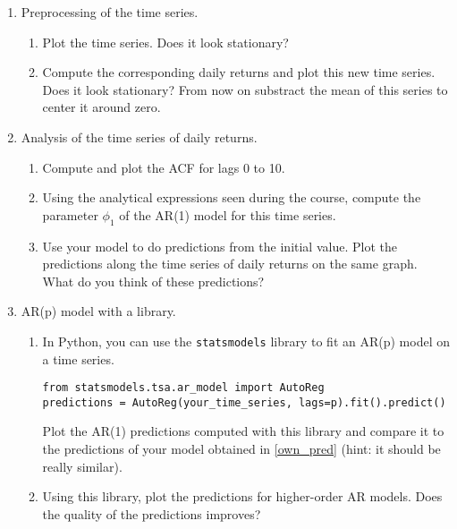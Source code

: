 \begin{enumerate}
    \item Preprocessing of the time series.
    \begin{enumerate}
        \item Plot the time series. Does it look stationary?
        \item Compute the corresponding daily returns and plot this new time series. Does it look stationary? From now on substract the mean of this series to center it around zero.
    \end{enumerate}
    \item Analysis of the time series of daily returns.
    \begin{enumerate}
        \item Compute and plot the ACF for lags 0 to 10. 
        \item Using the analytical expressions seen during the course, compute the parameter $\phi_1$ of the AR(1) model for this time series.
        \item\label{own_pred} Use your model to do predictions from the initial value. Plot the predictions along the time series of daily returns on the same graph. What do you think of these predictions?
    \end{enumerate}
    \item AR(p) model with a library.
    \begin{enumerate}
        \item In Python, you can use the \texttt{statsmodels} library to fit an AR(p) model on a time series. 

\begin{verbatim}
from statsmodels.tsa.ar_model import AutoReg
predictions = AutoReg(your_time_series, lags=p).fit().predict()
\end{verbatim}
        
            
            Plot the AR(1) predictions computed with this library and compare it to the predictions of your model obtained in \ref{own_pred} (hint: it should be really similar). 

        \item Using this library, plot the predictions for higher-order AR models. Does the quality of the predictions improves?
    \end{enumerate}
\end{enumerate}
